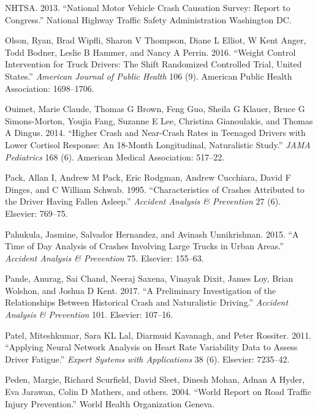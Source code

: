 \documentclass[12pt]{book}
\numberwithin{equation}{chapter}
\begin{document}
\leavevmode\hypertarget{ref-nhtsa2013national}{}%
NHTSA. 2013. ``National Motor Vehicle Crash Causation Survey: Report to Congress.'' National Highway Traffic Safety Administration Washington DC.

\leavevmode\hypertarget{ref-olson2016weight}{}%
Olson, Ryan, Brad Wipfli, Sharon V Thompson, Diane L Elliot, W Kent Anger, Todd Bodner, Leslie B Hammer, and Nancy A Perrin. 2016. ``Weight Control Intervention for Truck Drivers: The Shift Randomized Controlled Trial, United States.'' \emph{American Journal of Public Health} 106 (9). American Public Health Association: 1698--1706.

\leavevmode\hypertarget{ref-ouimet2014higher}{}%
Ouimet, Marie Claude, Thomas G Brown, Feng Guo, Sheila G Klauer, Bruce G Simons-Morton, Youjia Fang, Suzanne E Lee, Christina Gianoulakis, and Thomas A Dingus. 2014. ``Higher Crash and Near-Crash Rates in Teenaged Drivers with Lower Cortisol Response: An 18-Month Longitudinal, Naturalistic Study.'' \emph{JAMA Pediatrics} 168 (6). American Medical Association: 517--22.

\leavevmode\hypertarget{ref-pack1995characteristics}{}%
Pack, Allan I, Andrew M Pack, Eric Rodgman, Andrew Cucchiara, David F Dinges, and C William Schwab. 1995. ``Characteristics of Crashes Attributed to the Driver Having Fallen Asleep.'' \emph{Accident Analysis \& Prevention} 27 (6). Elsevier: 769--75.

\leavevmode\hypertarget{ref-pahukula2015time}{}%
Pahukula, Jasmine, Salvador Hernandez, and Avinash Unnikrishnan. 2015. ``A Time of Day Analysis of Crashes Involving Large Trucks in Urban Areas.'' \emph{Accident Analysis \& Prevention} 75. Elsevier: 155--63.

\leavevmode\hypertarget{ref-pande2017preliminary}{}%
Pande, Anurag, Sai Chand, Neeraj Saxena, Vinayak Dixit, James Loy, Brian Wolshon, and Joshua D Kent. 2017. ``A Preliminary Investigation of the Relationships Between Historical Crash and Naturalistic Driving.'' \emph{Accident Analysis \& Prevention} 101. Elsevier: 107--16.

\leavevmode\hypertarget{ref-patel2011applying}{}%
Patel, Miteshkumar, Sara KL Lal, Diarmuid Kavanagh, and Peter Rossiter. 2011. ``Applying Neural Network Analysis on Heart Rate Variability Data to Assess Driver Fatigue.'' \emph{Expert Systems with Applications} 38 (6). Elsevier: 7235--42.

\leavevmode\hypertarget{ref-peden2004world}{}%
Peden, Margie, Richard Scurfield, David Sleet, Dinesh Mohan, Adnan A Hyder, Eva Jarawan, Colin D Mathers, and others. 2004. ``World Report on Road Traffic Injury Prevention.'' World Health Organization Geneva.
\end{document}
